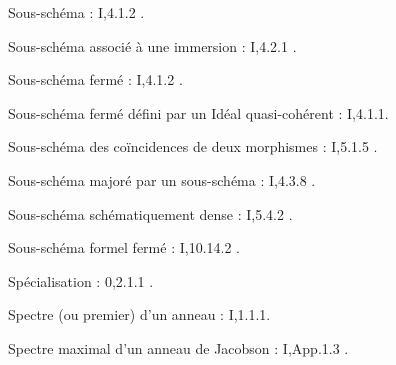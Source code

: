Sous-schéma : I,4.1.2 .

Sous-schéma associé à une immersion : I,4.2.1 .

Sous-schéma fermé : I,4.1.2 .

Sous-schéma fermé défini par un Idéal quasi-cohérent : I,4.1.1.

Sous-schéma des coïncidences de deux morphismes : I,5.1.5 .

Sous-schéma majoré par un sous-schéma : I,4.3.8 .

Sous-schéma schématiquement dense : I,5.4.2 .

Sous-schéma formel fermé : I,10.14.2 .

Spécialisation : 0,2.1.1 .

Spectre (ou  premier) d'un anneau : I,1.1.1.

Spectre maximal d'un anneau de Jacobson : I,App.1.3 .
